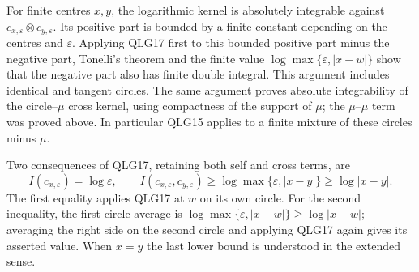 For finite centres \(x,y\), the logarithmic kernel is absolutely
integrable against \(c_{x,\varepsilon}\otimes c_{y,\varepsilon}\).
Its positive part is bounded by a finite constant depending on the
centres and \(\varepsilon\). Applying QLG17 first to this bounded
positive part minus the negative part, Tonelli's theorem and the finite
value \(\log\max\{\varepsilon,|x-w|\}\) show that the negative
part also has finite double integral. This argument includes identical
and tangent circles. The same argument proves absolute integrability
of the circle--\(\mu\) cross kernel, using compactness of the support
of \(\mu\); the \(\mu\)--\(\mu\) term was proved above.
In particular QLG15 applies to a finite mixture of these circles minus
\(\mu\).

Two consequences of QLG17, retaining both self and cross terms, are
\[
 I(c_{x,\varepsilon})=\log\varepsilon,\qquad
 I(c_{x,\varepsilon},c_{y,\varepsilon})
 \geq\log\max\{\varepsilon,|x-y|\}\geq\log|x-y|.
 \tag{QLG18}
\]
The first equality applies QLG17 at \(w\) on its own circle.
For the second inequality, the first circle average is
\(\log\max\{\varepsilon,|x-w|\}\geq\log|x-w|\);
averaging the right side on the second circle and applying QLG17 again
gives its asserted value. When \(x=y\) the last lower bound is
understood in the extended sense.

